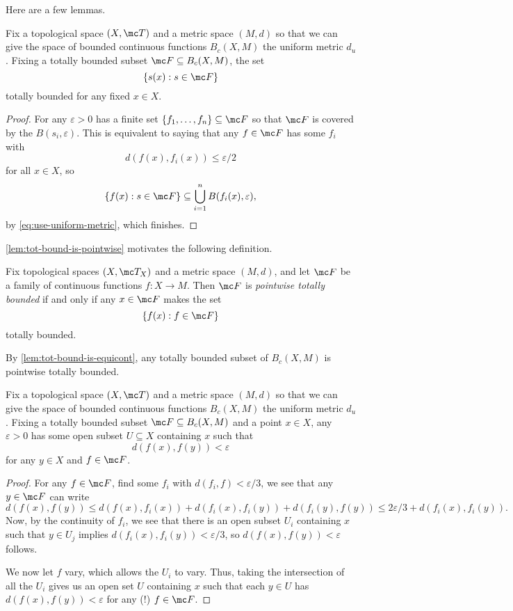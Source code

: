 \documentclass[../notes.tex]{subfiles}
\begin{document}
Here are a few lemmas.
\begin{lemma} \label{lem:tot-bound-is-pointwise}
	Fix a topological space $(X,\mc T)$ and a metric space $(M,d)$ so that we can give the space of bounded continuous functions $B_c(X,M)$ the uniform metric $d_u$. Fixing a totally bounded subset $\mc F\subseteq B_c(X,M)$, the set
	\[\{s(x):s\in \mc F\}\]
	totally bounded for any fixed $x\in X$.
\end{lemma}
\begin{proof}
	For any $\varepsilon>0$ has a finite set $\{f_1,\ldots,f_n\}\subseteq \mc F$ so that $\mc F$ is covered by the $B(s_i,\varepsilon)$. This is equivalent to saying that any $f\in \mc F$ has some $f_i$ with
	\begin{equation}
		d(f(x),f_i(x))\le\varepsilon/2 \label{eq:use-uniform-metric}
	\end{equation}
	for all $x\in X$, so
	\[\{f(x):s\in \mc F\}\subseteq\bigcup_{i=1}^nB(f_i(x),\varepsilon),\]
	by \autoref{eq:use-uniform-metric}, which finishes.
\end{proof}
\autoref{lem:tot-bound-is-pointwise} motivates the following definition.
\begin{definition}
	Fix topological spaces $(X,\mc T_X)$ and a metric space $(M,d)$, and let $\mc F$ be a family of continuous functions $f\colon X\to M$. Then $\mc F$ is \textit{pointwise totally bounded} if and only if any $x\in \mc F$ makes the set
	\[\{f(x):f\in\mc F\}\]
	totally bounded.
\end{definition}
\begin{example}
	By \autoref{lem:tot-bound-is-equicont}, any totally bounded subset of $B_c(X,M)$ is pointwise totally bounded.
\end{example}
\begin{lemma} \label{lem:tot-bound-is-equicont}
	Fix a topological space $(X,\mc T)$ and a metric space $(M,d)$ so that we can give the space of bounded continuous functions $B_c(X,M)$ the uniform metric $d_u$. Fixing a totally bounded subset $\mc F\subseteq B_c(X,M)$ and a point $x\in X$, any $\varepsilon>0$ has some open subset $U\subseteq X$ containing $x$ such that
	\[d(f(x),f(y))<\varepsilon\]
	for any $y\in X$ and $f\in \mc F$.
\end{lemma}
\begin{proof}
	For any $f\in \mc F$, find some $f_i$ with $d(f_i,f)<\varepsilon/3$, we see that any $y\in \mc F$ can write
	\[d(f(x),f(y))\le d(f(x),f_i(x))+d(f_i(x),f_i(y))+d(f_i(y),f(y))\le2\varepsilon/3+d(f_i(x),f_i(y)).\]
	Now, by the continuity of $f_i$, we see that there is an open subset $U_i$ containing $x$ such that $y\in U_j$ implies $d(f_i(x),f_i(y))<\varepsilon/3$, so $d(f(x),f(y))<\varepsilon$ follows.

	We now let $f$ vary, which allows the $U_i$ to vary. Thus, taking the intersection of all the $U_i$ gives us an open set $U$ containing $x$ such that each $y\in U$ has $d(f(x),f(y))<\varepsilon$ for any (!) $f\in \mc F$.
\end{proof}
\end{document}
